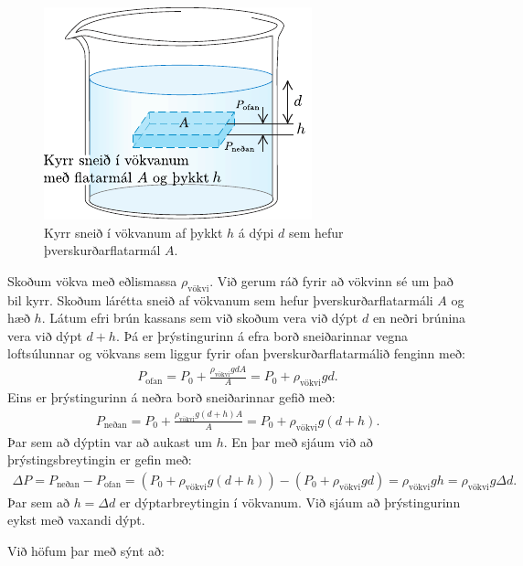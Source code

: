 \ifdefined \wholebook \else\documentclass[oneside]{book}\usepackage{EdlBook}\graphicspath{{figures/}}
\begin{document}
\begin{minipage}{\linewidth}
\begin{figure}
    \centering
    \includegraphics{figures/thykkt.pdf}
    \caption{Kyrr sneið í vökvanum af þykkt $h$ á dýpi $d$ sem hefur þverskurðarflatarmál $A$.}
    \label{fig:dummythick}
\end{figure}

Skoðum vökva með eðlismassa $\rho_{\text{vökvi}}$. Við gerum ráð fyrir að vökvinn sé um það bil kyrr. Skoðum lárétta sneið af vökvanum sem hefur þverskurðarflatarmáli $A$ og hæð $h$. Látum efri brún kassans sem við skoðum vera við dýpt $d$ en neðri brúnina vera við dýpt $d+h$. Þá er þrýstingurinn á efra borð sneiðarinnar vegna loftsúlunnar og vökvans sem liggur fyrir ofan þverskurðarflatarmálið fenginn með:
\begin{align*}
    P_{\text{ofan}} = P_0 + \frac{\rho_{\text{vökvi}}gdA}{A} = P_0 + \rho_{\text{vökvi}}gd.
\end{align*}
Eins er þrýstingurinn á neðra borð sneiðarinnar gefið með:
\begin{align*}
    P_{\text{neðan}} = P_0 + \frac{\rho_{\text{vökvi}}g(d+h)A}{A} = P_0 + \rho_{\text{vökvi}}g(d+h).
\end{align*}
Þar sem að dýptin var að aukast um $h$. En þar með sjáum við að þrýstingsbreytingin er gefin með:
\begin{align*}
    \Delta P = P_{\text{neðan}} - P_{\text{ofan}} = \left( P_0 + \rho_{\text{vökvi}}g(d+h) \right) -  \left( P_0 + \rho_{\text{vökvi}}gd \right) = \rho_{\text{vökvi}}gh = \rho_{\text{vökvi}}g\Delta d.
\end{align*}
Þar sem að $h = \Delta d$ er dýptarbreytingin í vökvanum. Við sjáum að þrýstingurinn eykst með vaxandi dýpt.

Við höfum þar með sýnt að:

\end{minipage}
\end{document}
